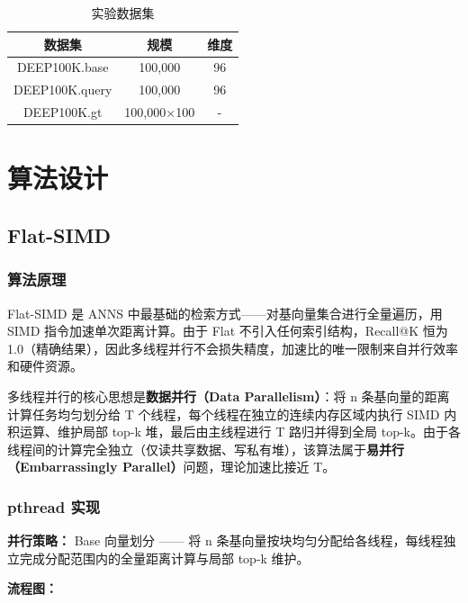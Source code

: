 \documentclass[a4paper]{article}
\begin{document}
\begin{table}[htbp]
\centering
\caption{实验数据集}
\begin{tabular}{ccc}
\toprule
数据集 & 规模 & 维度 \\
\midrule
DEEP100K.base & 100,000 & 96 \\
DEEP100K.query & 100,000 & 96 \\
DEEP100K.gt & 100,000×100 & - \\
\bottomrule
\end{tabular}
\end{table}

\section{算法设计}

\subsection{Flat-SIMD}

\subsubsection{算法原理}

Flat-SIMD 是 ANNS 中最基础的检索方式——对基向量集合进行全量遍历，用 SIMD 指令加速单次距离计算。由于 Flat 不引入任何索引结构，Recall@K 恒为 1.0（精确结果），因此多线程并行不会损失精度，加速比的唯一限制来自并行效率和硬件资源。

多线程并行的核心思想是\textbf{数据并行（Data Parallelism）}：将 n 条基向量的距离计算任务均匀划分给 T 个线程，每个线程在独立的连续内存区域内执行 SIMD 内积运算、维护局部 top-k 堆，最后由主线程进行 T 路归并得到全局 top-k。由于各线程间的计算完全独立（仅读共享数据、写私有堆），该算法属于\textbf{易并行（Embarrassingly Parallel）}问题，理论加速比接近 T。

\subsubsection{pthread 实现}

\textbf{并行策略：} Base 向量划分 —— 将 n 条基向量按块均匀分配给各线程，每线程独立完成分配范围内的全量距离计算与局部 top-k 维护。

\textbf{流程图：}
\end{document}
